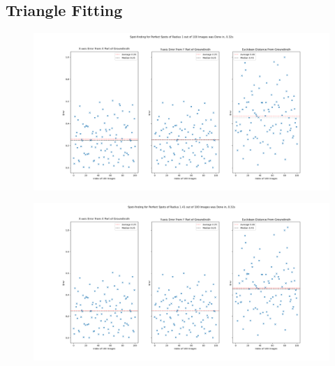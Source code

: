 \documentclass[aps,pra,a4paper,nofootinbib,onecolumn,tightenlines,longbibliography,12pt,amsfonts,amssymb,amsmath,floatfix]{revtex4-2} %
\begin{document}
  \subsection{Triangle Fitting} %
  \label{sub:Triangle Fitting}
  
    \begin{figure}[H]
      \begin{center}
        \includegraphics[width=1.0\textwidth]{project_pics/error_r1.png}
      \end{center}
      \caption{}
      \label{fig:tri_er_r1}
    \end{figure}
    
    \begin{figure}[H]
      \begin{center}
        \includegraphics[width=1.0\textwidth]{project_pics/error_r141.png}
      \end{center}
      \caption{}
      \label{fig:tri_er_r141}
    \end{figure}
    
\end{document}
